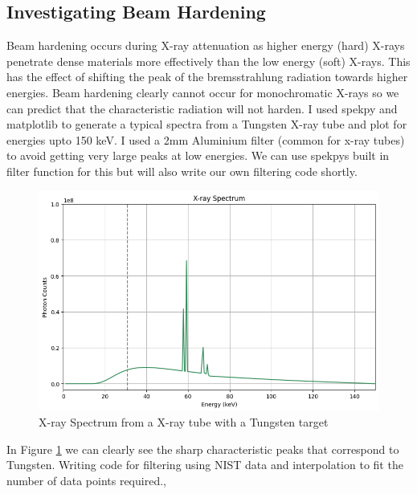 \documentclass{article}
\begin{document}
\subsection{Investigating Beam Hardening}
Beam hardening occurs during X-ray attenuation as higher energy (hard) X-rays penetrate dense materials more effectively than the low energy (soft) X-rays. This has the effect of shifting the peak of the bremsstrahlung radiation towards higher energies. Beam hardening clearly cannot occur for monochromatic X-rays so we can predict that the characteristic radiation will not harden.
I used spekpy and matplotlib to generate a typical spectra from a Tungsten X-ray tube and plot for energies upto 150 keV. I used a 2mm Aluminium filter (common for x-ray tubes) to avoid getting very large peaks at low energies. We can use spekpys built in filter function for this but will also write our own filtering code shortly.

\begin{figure}
	\includegraphics[width=\linewidth]{typicalxrayspectra.png}
	\caption{X-ray Spectrum from a X-ray tube with a Tungsten target}
  \label{fig:basespectra}
\end{figure}

In Figure \ref{fig:basespectra} we can clearly see the sharp characteristic peaks that correspond to Tungsten. Writing code for filtering using NIST data and interpolation to fit the number of data points required., 
\end{document}
